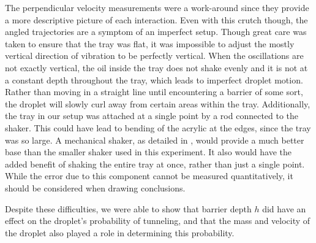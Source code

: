 The perpendicular velocity measurements were a work-around since they provide a more descriptive picture of each interaction. Even with this crutch though, the angled trajectories are a symptom of an imperfect setup. Though great care was taken to ensure that the tray was flat, it was impossible to adjust the mostly vertical direction of vibration to be perfectly vertical. When the oscillations are not exactly vertical, the oil inside the tray does not shake evenly and it is not at a constant depth throughout the tray, which leads to imperfect droplet motion. Rather than moving in a straight line until encountering a barrier of some sort, the droplet will slowly curl away from certain areas within the tray. Additionally, the tray in our setup was attached at a single point by a rod connected to the shaker. This could have lead to bending of the acrylic at the edges, since the tray was so large. A mechanical shaker, as detailed in , would provide a much better base than the smaller shaker used in this experiment. It also would have the added benefit of shaking the entire tray at once, rather than just a single point. While the error due to this component cannot be measured quantitatively, it should be considered when drawing conclusions. 
   
    Despite these difficulties, we were able to show that barrier depth $h$ did have an effect on the droplet's probability of tunneling, and that the mass and velocity of the droplet also played a role in determining this probability.




